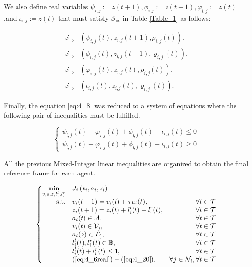 We also define real variables $\psi_{i,j}:= z(t+1), \phi_{i,j}:= z(t+1), \varphi_{i,j}:= z(t)$,and $ \iota_{i,j}:= z(t) $ that must satisfy $\mathcal{S}_\Rightarrow$ in Table \ref{Table_1} as follows:

\begin{align}
\mathcal{S}_\Rightarrow & (\psi_{i,j}(t),z_{i,j}(t+1),\rho_{i,j}(t)).
\\
\mathcal{S}_\Rightarrow & (\phi_{i,j}(t),z_{i,j}(t+1),\varrho_{i,j}(t)).
\\
\mathcal{S}_\Rightarrow & (\varphi_{i,j}(t),z_{i,j}(t),\rho_{i,j}(t)).
\\
\mathcal{S}_\Rightarrow & (\iota_{i,j}(t),z_{i,j}(t),\varrho_{i,j}(t)).
\end{align}


Finally, the equation \ref{eq:4_8} was reduced to a system of equations where the following pair of inequalities must be fulfilled.

\begin{equation}
\left\{\begin{matrix}
\psi_{i,j}(t) - \varphi_{i,j}(t) + \phi_{i,j}(t) - \iota_{i,j}(t) \leq 0\\ 
\psi_{i,j}(t) - \varphi_{i,j}(t) + \phi_{i,j}(t) - \iota_{i,j}(t) \geq 0
\end{matrix}\right.  
\label{eq:4_20}
\end{equation}

All the previous Mixed-Integer linear inequalities are organized to obtain the final reference frame for each agent.


\begin{align}
\left\{\begin{matrix}
\begin{aligned}
\min_{v,a,z, l_i^l,l_i^r} \quad & J_i\left ( v_i, a_i, z_i \right )\\
\textrm{s.t.} \quad & v_i(t+1) = v_i(t)+\tau a_i(t), & \forall t \in \mathcal{T}\\
  &   z_i(t+1) = z_i(t) + l_i^l(t) - l_i^r(t),  & \forall t \in \mathcal{T} \\
& a_i(t) \in \mathcal{A} , & \forall t \in \mathcal{T} \\
& v_i(t) \in \mathcal{V_i} , & \forall t \in \mathcal{T} \\
& a_i(z) \in \mathcal{L_i} , & \forall t \in \mathcal{T} \\
&  l_i^l(t),l_i^r(t)\in \mathbb{B},  & \forall t \in \mathcal{T} \\
& l_i^l(t) + l_i^r(t)  \leq 1, & \forall t \in \mathcal{T}\\
& (\text{\ref{eq:4_6real}}) - (\text{\ref{eq:4_20}}) . & \forall j \in \mathcal{N}_i, \forall t \in \mathcal{T} 
\end{aligned}
\end{matrix}\right.
\label{eq:MPC_problem}
\end{align}

